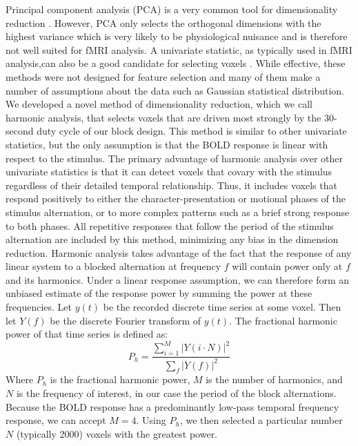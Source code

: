 \documentclass[review,1p,authoryear]{elsarticle}
\begin{document}
Principal component analysis (PCA) is a very common tool for dimensionality reduction \citep{Hotelling1933}.
However, PCA only selects the orthogonal dimensions with the highest variance which is very likely to be physiological nuisance and is therefore not well suited for fMRI analysis.
A univariate statistic, as typically used in  fMRI analysis,can also be a good candidate for selecting voxels \citep{Norman2006,Pereira2009}.
While effective, these methods were not designed for feature selection and many of them make a number of assumptions about the data such as Gaussian statistical distribution.
We developed a novel method of dimensionality reduction, which we call harmonic analysis, that selects voxels that are driven most strongly by the 30-second duty cycle of our block design.
This method is similar to other univariate statistics, but the only assumption is that the BOLD response is linear with respect to the stimulus.
The primary advantage  of harmonic analysis over other univariate statistics is that it can detect voxels that covary with the stimulus regardless of their detailed temporal relationship. Thus, it includes voxels that respond positively to either the character-presentation or motional phases of the stimulus alternation, or to more complex patterns such as a brief strong response to both phases. All repetitive responses that follow the period of the stimulus alternation are included by this method, minimizing any bias in the dimension reduction.
Harmonic analysis takes advantage of the fact that the response of any linear system to a blocked alternation at frequency $f$ will contain power only at $f$ and its harmonics. 
Under a linear response assumption, we can therefore form an unbiased estimate of the response power by summing the power at these frequencies. 
Let $y(t)$ be the recorded discrete time series at some voxel.
Then let $Y(f)$ be the discrete Fourier transform of $y(t)$.
The fractional harmonic power of that time series is defined as:
\begin{equation}
P_h = \frac{\sum_{i = 1}^{M}{\left|Y(i \cdot N)\right|^{2}}}{\sum_{f}{\left|Y(f)\right|^{2}}}
\end{equation}
Where $P_h$ is the fractional harmonic power, $M$ is the number of harmonics, and $N$ is the frequency of interest, in our case the period of the block alternations. 
Because the BOLD response has a predominantly low-pass temporal frequency response, we can accept $M = 4$. 
Using $P_h$, we then selected a particular number $N$ (typically 2000) voxels with the greatest power. 
\end{document}
